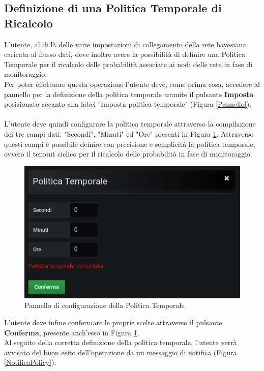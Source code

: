 \subsection{Definizione di una Politica Temporale di Ricalcolo}\label{policy}

L'utente, al di là delle varie impostazioni di collegamento della rete bayesiana caricata al flusso dati, deve inoltre avere la possibilità di definire una Politica Temporale per il ricalcolo delle probabilità associate ai nodi delle rete in fase di monitoraggio.\\
Per poter effettuare questa operazione l'utente deve, come prima cosa, accedere al pannello per la definizione della politica temporale tramite il pulsante \textbf{Imposta} posizionato accanto alla label "Imposta politica temporale" (Figura \ref{Pannello}).\\
~\\
L'utente deve quindi configurare la politica temporale attraverso la compilazione dei tre campi dati: "Secondi", "Minuti" ed "Ore" presenti in Figura \ref{PannelloPolicy}. Attraverso questi campi è possibile deinire con precisione e semplicità la politica temporale, ovvero il temout ciclico per il ricalcolo delle probabilità in fase di monitoraggio.

\begin{figure}[H]
	\begin{center}
		\includegraphics[scale=0.6]{./images/PannelloPolicy.png}
		 \caption{Pannello di configurazione della Politica Temporale}	
		 \label{PannelloPolicy}
	\end{center}
\end{figure} 

L'utente deve infine confermare le proprie scelte attraverso il pulsante \textbf{Conferma}, presente anch'esso in Figura \ref{PannelloPolicy}.
~\\
Al seguito della corretta definizione della politica temporale, l'utente verrà avvisato del buon esito dell'operazione da un messaggio di notifica (Figura \ref{NotificaPolicy}). 

